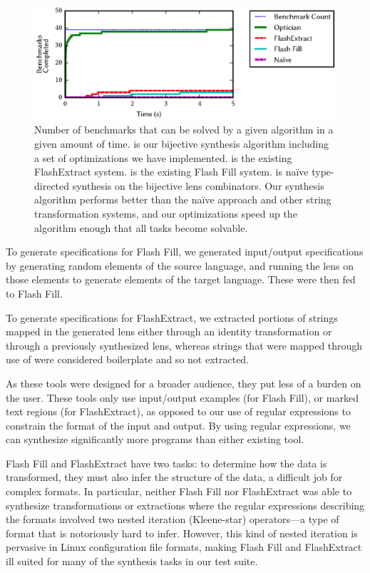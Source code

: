 \documentclass[12pt]{article}
\begin{document}
{\begin{figure}
  \includegraphics{figs/times}
  \caption{
    Number of benchmarks that can be solved by a given algorithm in a given
    amount of time.
    \Optician{} is our bijective synthesis algorithm including a set
    of optimizations we have implemented.
    \FlashExtractMode{} is the existing FlashExtract system.  \FlashFillMode{} is
    the existing Flash Fill system.  \NaiveMode{} is na\"{i}ve type-directed 
    synthesis on the bijective lens combinators.  Our synthesis algorithm performs
    better than the na\"{i}ve approach and other string transformation systems,
    and our optimizations speed up the algorithm enough that all tasks become
    solvable.
  }
  \label{fig:synthesis-times}
\end{figure}

To generate specifications for Flash Fill, we generated input/output
specifications by generating random elements of the source language, and
running the lens on those elements to generate elements of the target language.
These were then fed to Flash Fill.

To generate specifications for FlashExtract, we extracted portions of strings
mapped in the generated lens either through an identity
transformation or through a previously synthesized lens, whereas strings that were
mapped through use of \ConstLens{} were considered boilerplate and so not
extracted.

As these tools were designed for a broader audience, they put less of a burden
on the user.  These tools only use input/output examples (for Flash
Fill), or marked text regions (for FlashExtract), as opposed
to our use of regular expressions to constrain the format of
the input and output.  By using regular expressions,
we can synthesize significantly more programs
than either existing tool.

Flash Fill and FlashExtract have two tasks: to determine how
the data is transformed, they must also infer the structure of the data, a
difficult job for complex formats.
In particular, neither Flash Fill nor FlashExtract was able to synthesize
transformations or extractions where the regular expressions describing the
formats involved two nested iteration (Kleene-star) operators---a type of format
that is notoriously hard to infer.
However, this kind of nested iteration is pervasive in Linux configuration
file formats, making Flash Fill and FlashExtract ill suited for many of the
synthesis tasks in our test suite.

}
\end{document}
